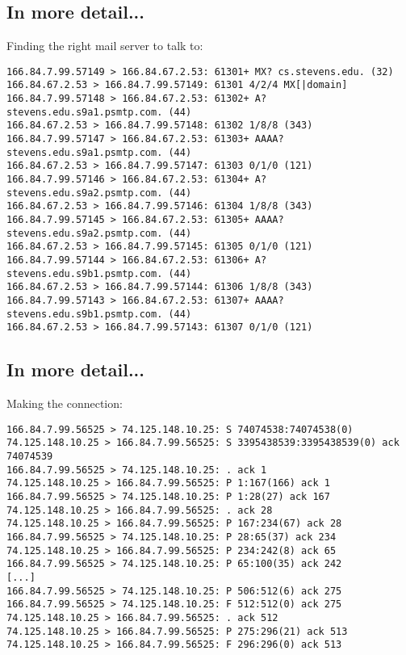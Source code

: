 \documentclass[xga]{xdvislides}
\begin{document}
\subsection{In more detail...}
Finding the right mail server to talk to:
\begin{verbatim}
166.84.7.99.57149 > 166.84.67.2.53: 61301+ MX? cs.stevens.edu. (32)
166.84.67.2.53 > 166.84.7.99.57149: 61301 4/2/4 MX[|domain]
166.84.7.99.57148 > 166.84.67.2.53: 61302+ A? stevens.edu.s9a1.psmtp.com. (44)
166.84.67.2.53 > 166.84.7.99.57148: 61302 1/8/8 (343)
166.84.7.99.57147 > 166.84.67.2.53: 61303+ AAAA? stevens.edu.s9a1.psmtp.com. (44)
166.84.67.2.53 > 166.84.7.99.57147: 61303 0/1/0 (121)
166.84.7.99.57146 > 166.84.67.2.53: 61304+ A? stevens.edu.s9a2.psmtp.com. (44)
166.84.67.2.53 > 166.84.7.99.57146: 61304 1/8/8 (343)
166.84.7.99.57145 > 166.84.67.2.53: 61305+ AAAA? stevens.edu.s9a2.psmtp.com. (44)
166.84.67.2.53 > 166.84.7.99.57145: 61305 0/1/0 (121)
166.84.7.99.57144 > 166.84.67.2.53: 61306+ A? stevens.edu.s9b1.psmtp.com. (44)
166.84.67.2.53 > 166.84.7.99.57144: 61306 1/8/8 (343)
166.84.7.99.57143 > 166.84.67.2.53: 61307+ AAAA? stevens.edu.s9b1.psmtp.com. (44)
166.84.67.2.53 > 166.84.7.99.57143: 61307 0/1/0 (121)
\end{verbatim}
\Normalsize

\subsection{In more detail...}
Making the connection:
\begin{verbatim}
166.84.7.99.56525 > 74.125.148.10.25: S 74074538:74074538(0)
74.125.148.10.25 > 166.84.7.99.56525: S 3395438539:3395438539(0) ack 74074539
166.84.7.99.56525 > 74.125.148.10.25: . ack 1
74.125.148.10.25 > 166.84.7.99.56525: P 1:167(166) ack 1
166.84.7.99.56525 > 74.125.148.10.25: P 1:28(27) ack 167
74.125.148.10.25 > 166.84.7.99.56525: . ack 28
74.125.148.10.25 > 166.84.7.99.56525: P 167:234(67) ack 28
166.84.7.99.56525 > 74.125.148.10.25: P 28:65(37) ack 234
74.125.148.10.25 > 166.84.7.99.56525: P 234:242(8) ack 65
166.84.7.99.56525 > 74.125.148.10.25: P 65:100(35) ack 242
[...]
166.84.7.99.56525 > 74.125.148.10.25: P 506:512(6) ack 275
166.84.7.99.56525 > 74.125.148.10.25: F 512:512(0) ack 275
74.125.148.10.25 > 166.84.7.99.56525: . ack 512
74.125.148.10.25 > 166.84.7.99.56525: P 275:296(21) ack 513
74.125.148.10.25 > 166.84.7.99.56525: F 296:296(0) ack 513
\end{verbatim}
\Normalsize
\end{document}
